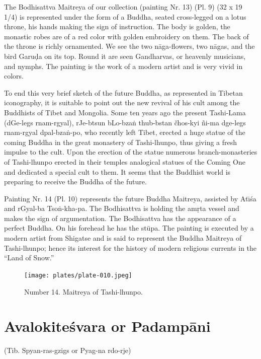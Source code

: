\documentclass[a4paper, 12pt, oneside]{article}
\begin{document}
\bigskip

The Bodhisattva Maitreya of our collection (painting Nr. 13) (Pl. 9) (32 x 19 1/4) is represented under the form of a Buddha, seated cross-legged on a lotus throne, his hands making the sign of instruction. The body is golden, the monastic robes are of a red color with golden embroidery on them. The back of the throne is richly ornamented. We see the two n\={a}ga-flowers, two n\={a}gas, and the bird Garu\d{d}a on its top. Round it are seen Gandharvas, or heavenly musicians, and nymphs. The painting is the work of a modern artist and is very vivid in colors.

To end this very brief sketch of the future Buddha, as represented in Tibetan iconography, it is suitable to point out the new revival of his cult among the Buddhists of Tibet and Mongolia. Some ten years ago the present Tashi-Lama (dGe-legs rnam-rgyal), rJe-btsun bLo-bza\.{n} thub-bstan čhos-kyi \~{n}i-ma dge-legs rnam-rgyal dpal-bza\.{n}-po, who recently left Tibet, erected a huge statue of the coming Buddha in the great monastery of Tashi-lhunpo, thus giving a fresh impulse to the cult. Upon the erection of the statue numerous branch-monasteries of Tashi-lhunpo erected in their temples analogical statues of the Coming One and dedicated a special cult to them. It seems that the Buddhist world is preparing to receive the Buddha of the future.

\bigskip

Painting Nr. 14 (Pl. 10) represents the future Buddha Maitreya, assisted by At\={\i}\'{s}a and rGyal-ba Tso\.{n}-kha-pa. The Bodhisattva is holding the am\d{r}ta vessel and makes the sign of argumentation. The Bodhisattva has the appearance of a perfect Buddha. On his forehead he has the st\={u}pa. The painting is executed by a modern artist from Shigatse and is said to represent the Buddha Maitreya of Tashi-lhunpo; hence its interest for the history of modern religious currents in the ``Land of Snow.''

\clearpage
\vspace*{\fill}
\begin{figure}[H]
\centering
\texttt{[image: plates/plate-010.jpeg]}
\caption*{Number 14. Maitreya of Tashi-lhunpo.}
\end{figure}
\vspace*{\fill}
\clearpage
\section{Avalokite\'{s}vara or Padamp\={a}ni}
\begin{center}
(Tib. Spyan-ras-gzigs or Pyag-na rdo-rje)
\end{center}
\end{document}
